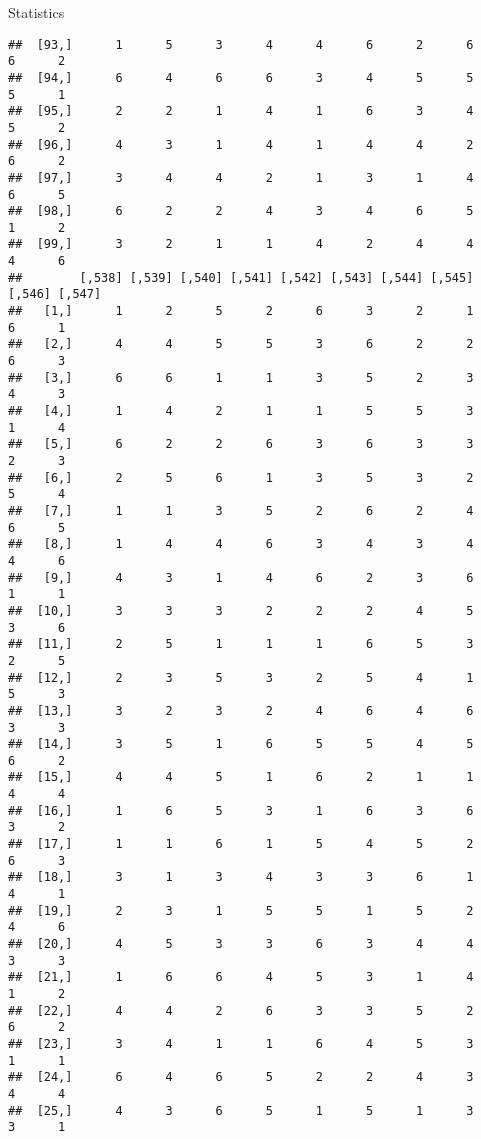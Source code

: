 \documentclass[
  ignorenonframetext,
]{beamer}
\begin{document}
\begin{frame}[fragile]{Statistics}
\begin{verbatim}
##  [93,]      1      5      3      4      4      6      2      6      6      2
##  [94,]      6      4      6      6      3      4      5      5      5      1
##  [95,]      2      2      1      4      1      6      3      4      5      2
##  [96,]      4      3      1      4      1      4      4      2      6      2
##  [97,]      3      4      4      2      1      3      1      4      6      5
##  [98,]      6      2      2      4      3      4      6      5      1      2
##  [99,]      3      2      1      1      4      2      4      4      4      6
##        [,538] [,539] [,540] [,541] [,542] [,543] [,544] [,545] [,546] [,547]
##   [1,]      1      2      5      2      6      3      2      1      6      1
##   [2,]      4      4      5      5      3      6      2      2      6      3
##   [3,]      6      6      1      1      3      5      2      3      4      3
##   [4,]      1      4      2      1      1      5      5      3      1      4
##   [5,]      6      2      2      6      3      6      3      3      2      3
##   [6,]      2      5      6      1      3      5      3      2      5      4
##   [7,]      1      1      3      5      2      6      2      4      6      5
##   [8,]      1      4      4      6      3      4      3      4      4      6
##   [9,]      4      3      1      4      6      2      3      6      1      1
##  [10,]      3      3      3      2      2      2      4      5      3      6
##  [11,]      2      5      1      1      1      6      5      3      2      5
##  [12,]      2      3      5      3      2      5      4      1      5      3
##  [13,]      3      2      3      2      4      6      4      6      3      3
##  [14,]      3      5      1      6      5      5      4      5      6      2
##  [15,]      4      4      5      1      6      2      1      1      4      4
##  [16,]      1      6      5      3      1      6      3      6      3      2
##  [17,]      1      1      6      1      5      4      5      2      6      3
##  [18,]      3      1      3      4      3      3      6      1      4      1
##  [19,]      2      3      1      5      5      1      5      2      4      6
##  [20,]      4      5      3      3      6      3      4      4      3      3
##  [21,]      1      6      6      4      5      3      1      4      1      2
##  [22,]      4      4      2      6      3      3      5      2      6      2
##  [23,]      3      4      1      1      6      4      5      3      1      1
##  [24,]      6      4      6      5      2      2      4      3      4      4
##  [25,]      4      3      6      5      1      5      1      3      3      1

\end{verbatim}
\end{frame}
\end{document}
